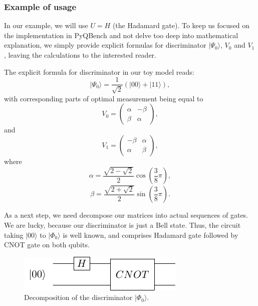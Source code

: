 \documentclass[preprint,12pt, a4paper, dvipsnames]{elsarticle}
\newcommand{\ket}[1]{\ensuremath{|#1\rangle}}
\newcommand{\1}{{\rm 1\hspace{-0.9mm}l}}
\begin{document}
\subsubsection{Example of usage}
In our example, we will use $U =  H$ (the Hadamard gate). To keep us focused on the implementation in PyQBench and not delve too deep into mathematical explanation, we simply provide explicit formulas for discriminator $\ket{\Psi_0} $, $V_0$ and $V_1$, leaving the calculations to the interested reader.

The explicit formula for discriminator in our toy model reads:
\begin{equation}
\ket{\Psi_0} = \frac{1}{\sqrt{2}} (\ket{00} + \ket{11}),
\end{equation}
with corresponding parts of optimal measurement being equal to
\begin{equation}
V_0 =
\left(\begin{array}{cc} \alpha & -\beta\\ \beta & \alpha \end{array}\right),
\end{equation}
and \begin{equation}
V_1 =
\left(\begin{array}{cc} -\beta & \alpha \\ \alpha & \beta \end{array}\right),
\end{equation}
where \begin{equation}
\alpha = \frac{\sqrt{2 - \sqrt{2}}}{2} \cos\left( \frac{3}{8} \pi \right),
\end{equation}
\begin{equation}
\beta  = \frac{\sqrt{2  + \sqrt{2}}}{2} \sin\left( \frac{3}{8} \pi \right).
\end{equation}

As a next step, we need decompose our matrices into actual sequences of gates.
We are lucky, because our discriminator is just a Bell state. Thus, the circuit taking $\ket{00}$ to $\ket{\Phi_0}$ is well known, and comprises Hadamard gate followed by CNOT gate on both qubits.
\begin{figure}[h!]
	\centering
	\includegraphics[scale=1.7]{pics/discriminator}
	\caption{Decomposition of the discriminator $\ket{\Phi_0}$. }
	\label{fig:discriminator}
\end{figure}
\end{document}
